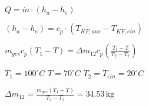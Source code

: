 \( \dot{Q} = \dot{m} \cdot (h_a - h_e) \)  

\( (h_a - h_e) = c_p \cdot (T_{KF,aus} - T_{KF,ein}) \)

\( m_{ges} c_p (T_1 - T) = \Delta m_{12} c_p \left( \frac{T_1 - T}{T_2 - T_2} \right) \)  

\( T_1 = 100^\circ C \)  
\( T = 70^\circ C \)  
\( T_2 = T_{ein} = 20^\circ C \)  

\( \Delta m_{12} = \frac{m_{ges} (T_1 - T)}{T_2 - T_2} = 34.53 \, \text{kg} \)